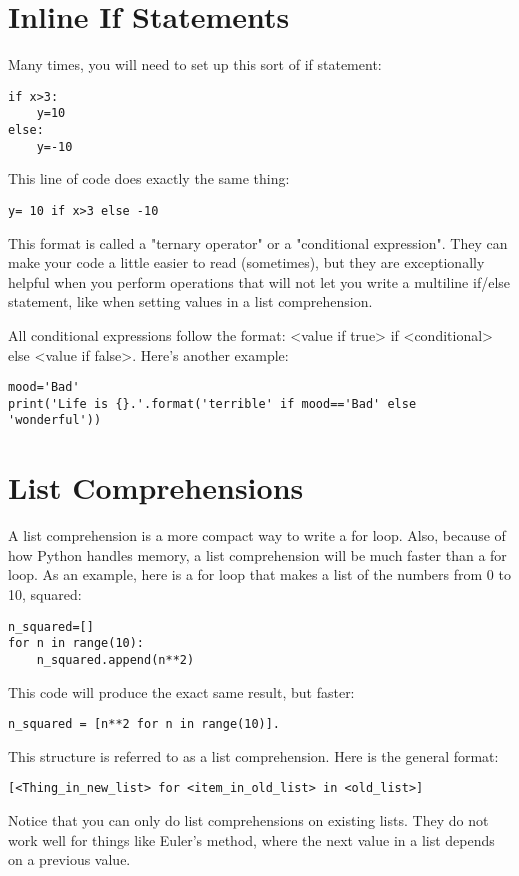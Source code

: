 \section{Inline If Statements}
Many times, you will need to set up this sort of if statement:
\begin{Verbatim}
if x>3:
    y=10
else:
    y=-10
\end{Verbatim}
This line of code does exactly the same thing:
\begin{Verbatim}
y= 10 if x>3 else -10
\end{Verbatim}
This format is called a "ternary operator" or a "conditional expression". They can make your code a little easier to read (sometimes), but they are exceptionally helpful when you perform operations that will not let you write a multiline if/else statement, like when setting values in a list comprehension.

All conditional expressions follow the format: <value if true> if <conditional> else <value if false>.  Here's another example:
\begin{Verbatim}
mood='Bad'
print('Life is {}.'.format('terrible' if mood=='Bad' else 'wonderful'))
\end{Verbatim}


\section{List Comprehensions}\label{sec:comprehensions}
A list comprehension is a more compact way to write a for loop.  Also, because of how Python handles memory, a list comprehension will be much faster than a for loop.  As an example, here is a for loop that makes a list of the numbers from 0 to 10, squared:
\begin{Verbatim}
n_squared=[]
for n in range(10):
    n_squared.append(n**2)

\end{Verbatim}
This code will produce the exact same result, but faster:
\begin{Verbatim}
n_squared = [n**2 for n in range(10)].
\end{Verbatim}
This structure is referred to as a list comprehension. Here is the general format:
\begin{Verbatim}
[<Thing_in_new_list> for <item_in_old_list> in <old_list>]
\end{Verbatim}
Notice that you can only do list comprehensions on existing lists.  They do not work well for things like Euler's method, where the next value in a list depends on a previous value.

